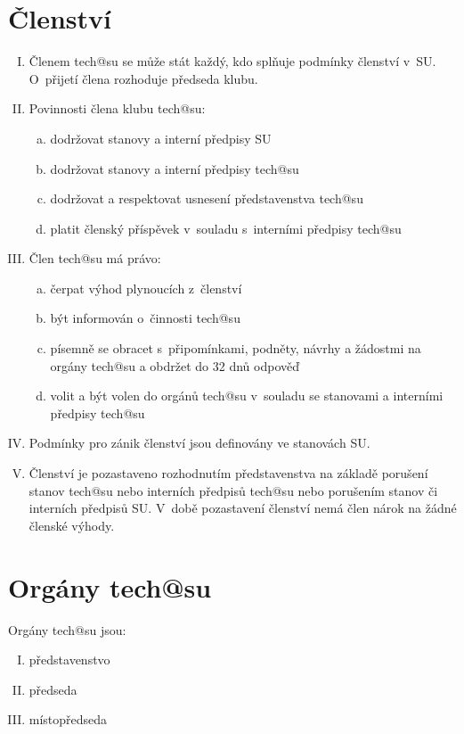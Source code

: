 \documentclass[10pt]{article}
\begin{document}
\section{Členství} %
	\begin{enumerate}[I.]
	\item Členem tech@su se může stát každý, kdo splňuje podmínky členství v~SU. O~přijetí člena rozhoduje předseda klubu.
	\item Povinnosti člena klubu tech@su: 
		\begin{enumerate}[a.]
		\item dodržovat stanovy a interní předpisy SU
		\item dodržovat stanovy a interní předpisy tech@su
		\item dodržovat a respektovat usnesení představenstva tech@su
		\item platit členský příspěvek v~souladu s~interními předpisy tech@su
		\end{enumerate}
	\item Člen tech@su má právo:
		\begin{enumerate}[a.]
		\item čerpat výhod plynoucích z~členství
		\item být informován o~činnosti tech@su 
		\item písemně se obracet s~připomínkami, podněty, návrhy a žádostmi na orgány tech@su a obdržet do 32 dnů odpověď
		\item volit a být volen do orgánů tech@su v~souladu se stanovami a interními předpisy tech@su
		\end{enumerate}
	\item Podmínky pro zánik členství jsou definovány ve stanovách SU.  
	\item Členství je pozastaveno rozhodnutím představenstva na základě porušení stanov tech@su nebo interních předpisů tech@su nebo porušením stanov či interních předpisů SU. V~době pozastavení členství nemá člen nárok na žádné členské výhody.     
	\end{enumerate}

\section{Orgány tech@su} %
Orgány tech@su jsou:
	\begin{enumerate}[I.]
	\item představenstvo 
	\item předseda  
	\item místopředseda  
	\end{enumerate}
\end{document}
